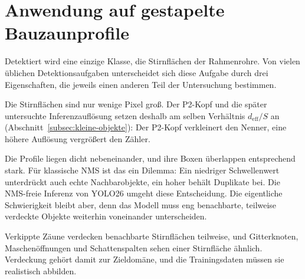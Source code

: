 \section{Anwendung auf gestapelte Bauzaunprofile}
\label{sec:anwendung}

Detektiert wird eine einzige Klasse, die Stirnflächen der Rahmenrohre. Von
vielen üblichen Detektionsaufgaben unterscheidet sich diese Aufgabe durch drei
Eigenschaften, die jeweils einen anderen Teil der Untersuchung bestimmen.

 Die Stirnflächen sind nur wenige Pixel groß. Der
P2-Kopf und die später untersuchte Inferenzauflösung setzen deshalb am selben
Verhältnis $d_{\mathrm{eff}}/S$ an (Abschnitt~\ref{subsec:kleine-objekte}):
Der P2-Kopf verkleinert den Nenner, eine höhere Auflösung vergrößert den
Zähler.

 Die Profile liegen dicht nebeneinander, und ihre
Boxen überlappen entsprechend stark. Für klassische NMS ist das ein Dilemma: Ein
niedriger Schwellenwert unterdrückt auch echte Nachbarobjekte, ein hoher behält
Duplikate bei. Die NMS-freie Inferenz von YOLO26 umgeht diese Entscheidung.
Die eigentliche Schwierigkeit bleibt aber, denn das Modell muss eng
benachbarte, teilweise verdeckte Objekte weiterhin voneinander unterscheiden.

 Verkippte Zäune verdecken benachbarte Stirnflächen
teilweise, und Gitterknoten, Maschenöffnungen und Schattenspalten sehen einer
Stirnfläche ähnlich. Verdeckung gehört damit zur Zieldomäne, und die
Trainingsdaten müssen sie realistisch abbilden.
